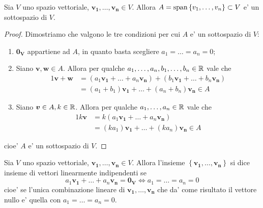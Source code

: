 \begin{proposition}
    Sia $V$ uno spazio vettoriale, $\bm{v_1}, \dots, \bm{v_n} \in V$. Allora $A = \operatorname{span}\left\{v_1, \dots, v_n\right\} \subset V$ e' un sottospazio di $V$.
\end{proposition}
\begin{proof}
    Dimostriamo che valgono le tre condizioni per cui $A$ e' un sottospazio di $V$:
    \begin{enumerate}
        \item $\bm{0_V}$ appartiene ad $A$, in quanto basta scegliere $a_1 = \dots = a_n = 0$;
        \item Siano $\bm{v}, \bm{w} \in A$. Allora per qualche $a_1, \dots, a_n, b_1, \dots, b_n \in \mathbb{R}$ vale che \begin{alignat*}{1}
            \bm{v} + \bm{w} &= (a_1\bm{v_1} + \dots + a_n\bm{v_n}) + (b_1\bm{v_1} + \dots + b_n\bm{v_n}) \\
            &= (a_1 + b_1)\bm{v_1} + \dots + (a_n + b_n)\bm{v_n} \in A
        \end{alignat*}
        \item Siano $\bm{v} \in A, k \in \mathbb{R}$. Allora per qualche $a_1, \dots, a_n \in \mathbb{R}$ vale che \begin{alignat*}{1}
            k\bm{v} &= k(a_1\bm{v_1} + \dots + a_n\bm{v_n})  \\
            &= (ka_1)\bm{v_1} + \dots + (ka_n)\bm{v_n} \in A
        \end{alignat*}
    \end{enumerate}
    cioe' $A$ e' un sottospazio di $V$.
\end{proof}

\begin{definition}
    Sia $V$ uno spazio vettoriale, $\bm{v_1}, \dots, \bm{v_n} \in V$. Allora l'insieme $\left\{ \bm{v_1}, \dots, \bm{v_n} \right\}$ si dice insieme di vettori linearmente indipendenti se
    \begin{equation}
        a_1\bm{v_1} + \dots + a_n\bm{v_n} = \bm{0_V} \iff a_1 = \dots = a_n = 0
    \end{equation}
    cioe' se l'unica combinazione lineare di $\bm{v_1}, \dots, \bm{v_n}$ che da' come risultato il vettore nullo e' quella con $a_1 = \dots = a_n = 0$.
\end{definition}

